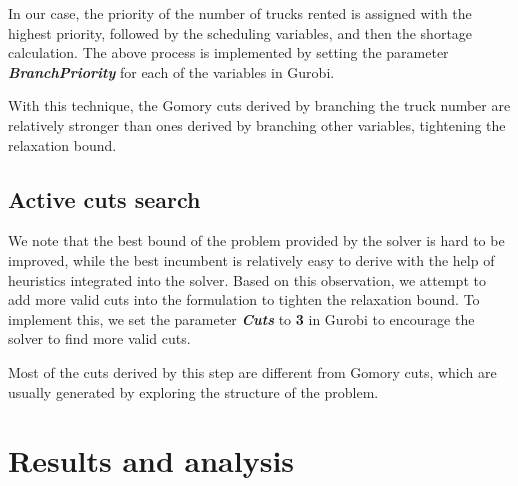 \documentclass[a4paper,12pt]{article}
\begin{document}
In our case, the priority of the number of trucks rented is assigned with the highest priority, followed by the scheduling variables, and then the shortage calculation.
The above process is implemented by setting the parameter \textbf{\textit{BranchPriority}} for each of the variables in Gurobi.

With this technique, the Gomory cuts derived by branching the truck number are relatively stronger than ones derived by branching other variables, tightening the relaxation bound.

\subsection{Active cuts search}\label{subsec:active-cuts-search}
We note that the best bound of the problem provided by the solver is hard to be improved, while the best incumbent is relatively easy to derive with the help of heuristics integrated into the solver.
Based on this observation, we attempt to add more valid cuts into the formulation to tighten the relaxation bound.
To implement this, we set the parameter \textbf{\textit{Cuts}} to \textbf{3} in Gurobi to encourage the solver to find more valid cuts.

Most of the cuts derived by this step are different from Gomory cuts, which are usually generated by exploring the structure of the problem.











\section{Results and analysis}\label{sec:results-and-analysis}
\end{document}
